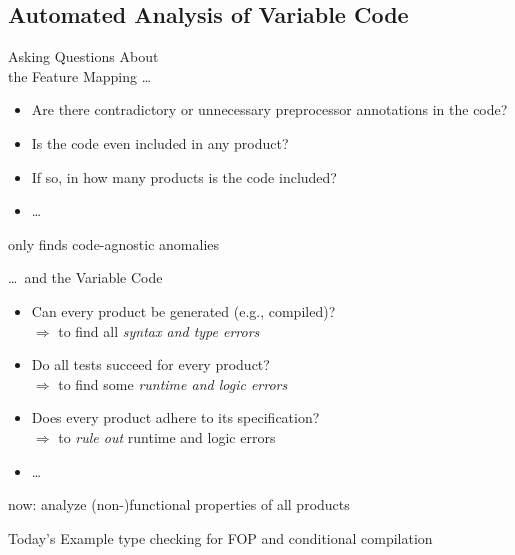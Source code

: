 \subsection{Automated Analysis of Variable Code}

\begin{frame}{\myframetitle}
	\begin{fancycolumns}[t,widths={46}]
		\begin{example}{Asking Questions About\\the Feature Mapping \ldots}
			\begin{itemize}
				\item Are there contradictory or unnecessary preprocessor annotations in the code?
				\item Is the code even included in any product?
				\item If so, in how many products is the code included?
				\item \ldots
			\end{itemize}
		\end{example}
		\begin{note}{}
			only finds code-agnostic anomalies
		\end{note}
		\nextcolumn
		\begin{example}{\ldots\ and the Variable Code}
			\begin{itemize}
				\item Can every product be generated (e.g., compiled)?\\
					$\Rightarrow$ to find all \emph{syntax and type errors}
				\item Do all tests succeed for every product?\\
					$\Rightarrow$ to find some \emph{runtime and logic errors}
				\item Does every product adhere to its specification?\\
					$\Rightarrow$ to \emph{rule out} runtime and logic errors
				\item \ldots
			\end{itemize}
		\end{example}
		\begin{note}{}
			now: analyze (non-)functional properties of all products
		\end{note}
		\begin{example}{Today's Example}
			type checking for FOP and conditional compilation
		\end{example}
	\end{fancycolumns}
\end{frame}

